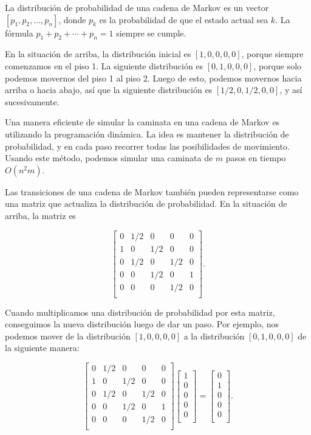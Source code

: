 La distribución de probabilidad de una cadena de Markov es un vector
$[p_1,p_2,\ldots,p_n]$, donde $p_k$ es la probabilidad de que el estado
actual sea $k$. La fórmula $p_1+p_2+\cdots+p_n=1$ siempre se cumple.

En la situación de arriba, la distribución inicial es $[1,0,0,0,0]$,
porque siempre comenzamos en el piso 1. La siguiente distribución es
$[0,1,0,0,0]$, porque solo podemos movernos del piso 1 al piso 2.
Luego de esto, podemos movernos hacia arriba o hacia abajo, así que
la siguiente distribución es $[1/2,0,1/2,0,0]$, y así sucesivamente.

Una manera eficiente de simular la caminata en una cadena de Markov es
utilizando la programación dinámica. La idea es mantener la distribución
de probabilidad, y en cada paso recorrer todas las posibilidades de
movimiento. Usando este método, podemos simular una caminata de $m$ pasos
en tiempo $O(n^2 m)$.

Las transiciones de una cadena de Markov también pueden representarse
como una matriz que actualiza la distribución de probabilidad. En la
situación de arriba, la matriz es

\[
    \begin{bmatrix}
        0 & 1/2 & 0   & 0   & 0 \\
        1 & 0   & 1/2 & 0   & 0 \\
        0 & 1/2 & 0   & 1/2 & 0 \\
        0 & 0   & 1/2 & 0   & 1 \\
        0 & 0   & 0   & 1/2 & 0 \\
    \end{bmatrix}.
\]

Cuando multiplicamos una distribución de probabilidad por esta matriz,
conseguimos la nueva distribución luego de dar un paso. Por ejemplo,
nos podemos mover de la distribución $[1,0,0,0,0]$ a la distribución
$[0,1,0,0,0]$ de la siguiente manera:

\[
    \begin{bmatrix}
        0 & 1/2 & 0   & 0   & 0 \\
        1 & 0   & 1/2 & 0   & 0 \\
        0 & 1/2 & 0   & 1/2 & 0 \\
        0 & 0   & 1/2 & 0   & 1 \\
        0 & 0   & 0   & 1/2 & 0 \\
    \end{bmatrix}
    \begin{bmatrix}
        1 \\
        0 \\
        0 \\
        0 \\
        0 \\
    \end{bmatrix}
    =
    \begin{bmatrix}
        0 \\
        1 \\
        0 \\
        0 \\
        0 \\
    \end{bmatrix}.
\]

